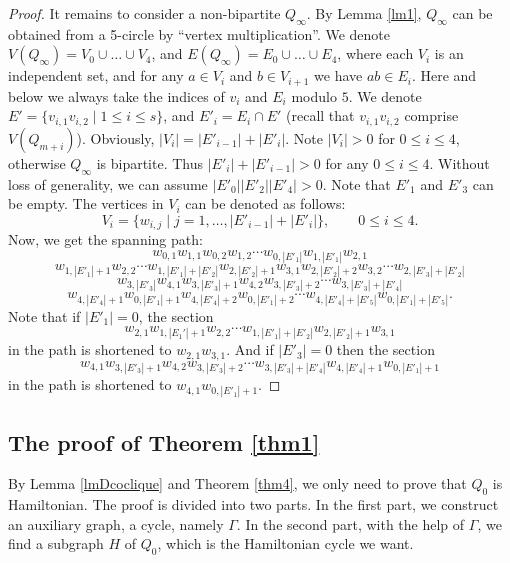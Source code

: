 \documentclass{amsart}
\theoremstyle{definition}
\begin{document}
\begin{proof}
It remains to consider a non-bipartite $Q_{\infty}$. By Lemma \ref{lm1},
$Q_{\infty}$ can be obtained from a 5-circle by ``vertex multiplication''. We
denote $V(Q_{\infty})=V_0\cup \dots \cup V_4$, and
$E(Q_{\infty})=E_0\cup \dots \cup E_4$, where each $V_i$ is an
independent set, and  for any $a\in V_i$ and $b\in V_{i+1}$ we have $ab\in E_i$. 
Here and below we always take the indices of $v_i$ and $E_i$ modulo $5$.
We denote
$E'=\{v_{i,1}v_{i,2}\mid 1\leq i\leq s\}$, and $E'_i=E_i\cap E'$ (recall that $v_{i,1}v_{i,2}$
comprise $V(Q_{m+i})$). Obviously,
$|V_i|=|E'_{i-1}|+|E'_i|$. Note $|V_i|>0$ for $0\leq i\leq 4$, otherwise
$Q_{\infty}$ is bipartite. Thus $|E'_i|+|E'_{i-1}|>0$ for any $0\leq i\leq 4$. 
Without loss of generality, we can assume $|E'_0||E'_2||E'_4|>0$.
Note that $E'_1$ and $E'_3$ can be empty.
The vertices in $V_i$ can be denoted as follows:
$$V_i=\{w_{i,j}\mid j=1,\ldots,|E'_{i-1}|+|E'_i|\},\qquad 0\leq i\leq 4.$$
Now, we get the spanning path:
$$w_{0,1}w_{1,1}w_{0,2}w_{1,2}\cdots w_{0,|E'_1|}w_{1,|E'_1|}w_{2,1}$$
$$w_{1,|E'_1|+1}w_{2,2}\cdots w_{1,|E'_1|+|E'_2|}w_{2,|E'_2|+1}w_{3,1}w_{2,|E'_2|+2}w_{3,2}\cdots w_{2,|E'_3|+|E'_2|}$$
$$w_{3,|E'_3|}w_{4,1}w_{3,|E'_3|+1}w_{4,2}w_{3,|E'_3|+2}\cdots w_{3,|E'_3|+|E'_4|}$$
$$w_{4,|E'_4|+1}w_{0,|E'_1|+1}w_{4,|E'_4|+2}w_{0,|E'_1|+2}\cdots w_{4,|E'_4|+|E'_5|}w_{0,|E'_1|+|E'_5|}.$$
Note that if $|E'_1|=0$, the section $$w_{2,1}w_{1,|E_1'|+1}w_{2,2}\cdots w_{1,|E'_1|+|E'_2|}w_{2,|E'_2|+1}w_{3,1}$$ in the path is shortened to $w_{2,1}w_{3,1}$. And if $|E'_3|=0$ then the section $$w_{4,1}w_{3,|E'_3|+1}w_{4,2}w_{3,|E'_3|+2}\cdots w_{3,|E'_3|+|E'_4|}w_{4,|E'_4|+1}w_{0,|E'_1|+1}$$ in the path is shortened to $w_{4,1}w_{0,|E'_1|+1}$.
\end{proof}

\subsection{The proof of Theorem \ref{thm1}}
By Lemma \ref{lmDcoclique} and Theorem \ref{thm4}, we only need to prove that $Q_0$ is Hamiltonian.
The proof is divided into two parts. In the first part, we construct an auxiliary graph, a cycle, namely $\Gamma$. In the second part, with the help of $\Gamma$, we find a subgraph $H$ of $Q_0$,  which is the Hamiltonian cycle we want.
\end{document}

